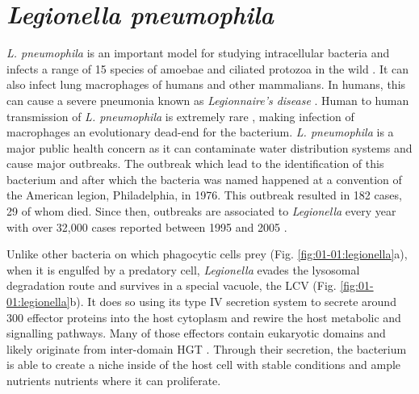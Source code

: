 \section{\textit{Legionella pneumophila}}

\textit{L. pneumophila} is an important model for studying intracellular bacteria and infects a range of 15 species of amoebae and ciliated protozoa in the wild \cite{rowbothamPreliminaryReportPathogenicity1980}. It can also infect lung macrophages of humans and other mammalians. In humans, this can cause a severe pneumonia known as \textit{Legionnaire's disease} \cite{edelsteinLegionnairesDiseasePontiac2014}. Human to human transmission of \textit{L. pneumophila} is extremely rare \cite{correiaProbablePersontoPersonTransmission2016}, making infection of macrophages an evolutionary dead-end for the bacterium. \textit{L. pneumophila} is a major public health concern as it can contaminate water distribution systems and cause major outbreaks. The outbreak which lead to the identification of this bacterium and after which the bacteria was named happened at a convention of the American legion, Philadelphia, in 1976. This outbreak resulted in 182 cases, 29 of whom died. Since then, outbreaks are associated to \textit{Legionella} every year with over 32,000 cases reported between 1995 and 2005 \cite{mcdadeLegionellaPreventionLegionellosis2008}.

Unlike other bacteria on which phagocytic cells prey (Fig. \ref{fig:01-01:legionella}a), when it is engulfed by a predatory cell, \textit{Legionella} evades the lysosomal degradation route and survives in a special vacuole, the \acrfull{LCV} (Fig. \ref{fig:01-01:legionella}b). It does so using its type IV secretion system to secrete around 300 effector proteins into the host cytoplasm and rewire the host metabolic and signalling pathways. Many of those effectors contain eukaryotic domains and likely originate from inter-domain \acrshort{HGT} \cite{felipeEvidenceAcquisitionLegionella2005}. Through their secretion, the bacterium is able to create a niche inside of the host cell with stable conditions and ample nutrients nutrients where it can proliferate.



